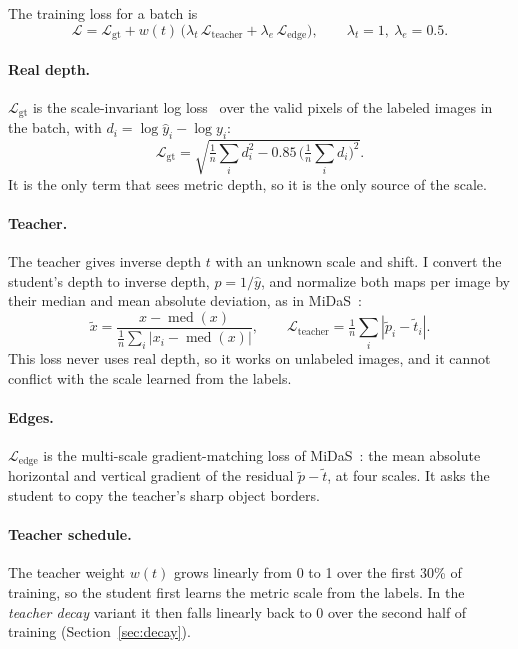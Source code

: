 \documentclass[11pt]{article}
\begin{document}
The training loss for a batch is
\begin{equation}
  \mathcal{L} = \mathcal{L}_{\text{gt}}
  + w(t)\,\big(\lambda_t\,\mathcal{L}_{\text{teacher}} + \lambda_e\,\mathcal{L}_{\text{edge}}\big),
  \qquad \lambda_t = 1,\ \lambda_e = 0.5 .
\end{equation}

\paragraph{Real depth.} $\mathcal{L}_{\text{gt}}$ is the scale-invariant log loss~\cite{eigen2014}
over the valid pixels of the labeled images in the batch, with $d_i = \log \hat{y}_i - \log y_i$:
\begin{equation}
  \mathcal{L}_{\text{gt}} = \sqrt{\tfrac{1}{n}\textstyle\sum_i d_i^2 - 0.85\,\big(\tfrac{1}{n}\sum_i d_i\big)^2}.
\end{equation}
It is the only term that sees metric depth, so it is the only source of the scale.

\paragraph{Teacher.} The teacher gives inverse depth $t$ with an unknown scale and shift. I convert
the student's depth to inverse depth, $p = 1/\hat{y}$, and normalize both maps per image by their
median and mean absolute deviation, as in MiDaS~\cite{ranftl2022}:
\begin{equation}
  \tilde{x} = \frac{x - \operatorname{med}(x)}{\tfrac{1}{n}\sum_i |x_i - \operatorname{med}(x)|},
  \qquad
  \mathcal{L}_{\text{teacher}} = \tfrac{1}{n}\textstyle\sum_i |\tilde{p}_i - \tilde{t}_i| .
\end{equation}
This loss never uses real depth, so it works on unlabeled images, and it cannot conflict with the
scale learned from the labels.

\paragraph{Edges.} $\mathcal{L}_{\text{edge}}$ is the multi-scale gradient-matching loss of
MiDaS~\cite{ranftl2022}: the mean absolute horizontal and vertical gradient of the residual
$\tilde{p} - \tilde{t}$, at four scales. It asks the student to copy the teacher's sharp object
borders.

\paragraph{Teacher schedule.} The teacher weight $w(t)$ grows linearly from 0 to 1 over the first
30\% of training, so the student first learns the metric scale from the labels. In the
\emph{teacher decay} variant it then falls linearly back to 0 over the second half of training
(Section~\ref{sec:decay}).
\end{document}
